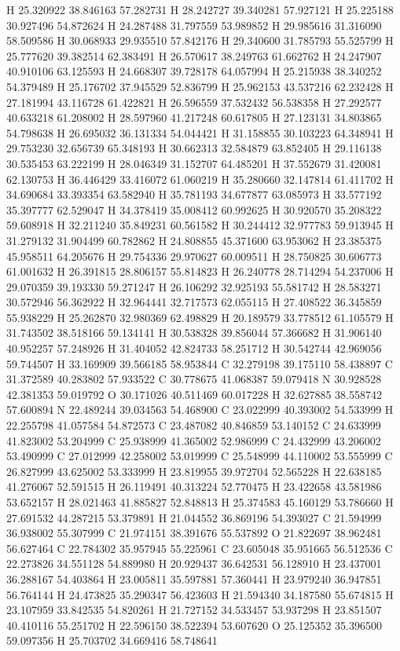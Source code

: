 \documentclass{article}
\begin{document}
H 25.320922 38.846163 57.282731 
H 28.242727 39.340281 57.927121 
H 25.225188 30.927496 54.872624 
H 24.287488 31.797559 53.989852 
H 29.985616 31.316090 58.509586 
H 30.068933 29.935510 57.842176 
H 29.340600 31.785793 55.525799 
H 25.777620 39.382514 62.383491 
H 26.570617 38.249763 61.662762 
H 24.247907 40.910106 63.125593 
H 24.668307 39.728178 64.057994 
H 25.215938 38.340252 54.379489 
H 25.176702 37.945529 52.836799 
H 25.962153 43.537216 62.232428 
H 27.181994 43.116728 61.422821 
H 26.596559 37.532432 56.538358 
H 27.292577 40.633218 61.208002 
H 28.597960 41.217248 60.617805 
H 27.123131 34.803865 54.798638 
H 26.695032 36.131334 54.044421 
H 31.158855 30.103223 64.348941 
H 29.753230 32.656739 65.348193 
H 30.662313 32.584879 63.852405 
H 29.116138 30.535453 63.222199 
H 28.046349 31.152707 64.485201 
H 37.552679 31.420081 62.130753 
H 36.446429 33.416072 61.060219 
H 35.280660 32.147814 61.411702 
H 34.690684 33.393354 63.582940 
H 35.781193 34.677877 63.085973 
H 33.577192 35.397777 62.529047 
H 34.378419 35.008412 60.992625 
H 30.920570 35.208322 59.608918 
H 32.211240 35.849231 60.561582 
H 30.244412 32.977783 59.913945 
H 31.279132 31.904499 60.782862 
H 24.808855 45.371600 63.953062 
H 23.385375 45.958511 64.205676 
H 29.754336 29.970627 60.009511 
H 28.750825 30.606773 61.001632 
H 26.391815 28.806157 55.814823 
H 26.240778 28.714294 54.237006 
H 29.070359 39.193330 59.271247 
H 26.106292 32.925193 55.581742 
H 28.583271 30.572946 56.362922 
H 32.964441 32.717573 62.055115 
H 27.408522 36.345859 55.938229 
H 25.262870 32.980369 62.498829 
H 20.189579 33.778512 61.105579 
H 31.743502 38.518166 59.134141 
H 30.538328 39.856044 57.366682 
H 31.906140 40.952257 57.248926 
H 31.404052 42.824733 58.251712 
H 30.542744 42.969056 59.744507 
H 33.169909 39.566185 58.953844 
C 32.279198 39.175110 58.438897 
C 31.372589 40.283802 57.933522 
C 30.778675 41.068387 59.079418 
N 30.928528 42.381353 59.019792 
O 30.171026 40.511469 60.017228 
H 32.627885 38.558742 57.600894 
N 22.489244 39.034563 54.468900 
C 23.022999 40.393002 54.533999 
H 22.255798 41.057584 54.872573 
C 23.487082 40.846859 53.140152 
C 24.633999 41.823002 53.204999 
C 25.938999 41.365002 52.986999 
C 24.432999 43.206002 53.490999 
C 27.012999 42.258002 53.019999 
C 25.548999 44.110002 53.555999 
C 26.827999 43.625002 53.333999 
H 23.819955 39.972704 52.565228 
H 22.638185 41.276067 52.591515 
H 26.119491 40.313224 52.770475 
H 23.422658 43.581986 53.652157 
H 28.021463 41.885827 52.848813 
H 25.374583 45.160129 53.786660 
H 27.691532 44.287215 53.379891 
H 21.044552 36.869196 54.393027 
C 21.594999 36.938002 55.307999 
C 21.974151 38.391676 55.537892 
O 21.822697 38.962481 56.627464 
C 22.784302 35.957945 55.225961 
C 23.605048 35.951665 56.512536 
C 22.273826 34.551128 54.889980 
H 20.929437 36.642531 56.128910 
H 23.437001 36.288167 54.403864 
H 23.005811 35.597881 57.360441 
H 23.979240 36.947851 56.764144 
H 24.473825 35.290347 56.423603 
H 21.594340 34.187580 55.674815 
H 23.107959 33.842535 54.820261 
H 21.727152 34.533457 53.937298 
H 23.851507 40.410116 55.251702 
H 22.596150 38.522394 53.607620 
O 25.125352 35.396500 59.097356 
H 25.703702 34.669416 58.748641 
~     
    
\end{document}
